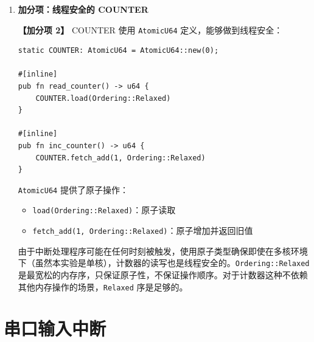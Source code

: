 \documentclass{SYSUReport}
\begin{document}
\begin{enumerate}[label={\chinese*、},labelsep=0pt, start=6]
    \item \textbf{加分项：线程安全的 COUNTER}

    \textbf{【加分项 2】} COUNTER 使用 \texttt{AtomicU64} 定义，能够做到线程安全：

    \begin{verbatim}
static COUNTER: AtomicU64 = AtomicU64::new(0);

#[inline]
pub fn read_counter() -> u64 {
    COUNTER.load(Ordering::Relaxed)
}

#[inline]
pub fn inc_counter() -> u64 {
    COUNTER.fetch_add(1, Ordering::Relaxed)
}
    \end{verbatim}

    \texttt{AtomicU64} 提供了原子操作：
    \begin{itemize}
        \item \texttt{load(Ordering::Relaxed)}：原子读取
        \item \texttt{fetch\_add(1, Ordering::Relaxed)}：原子增加并返回旧值
    \end{itemize}

    由于中断处理程序可能在任何时刻被触发，使用原子类型确保即使在多核环境下（虽然本实验是单核），计数器的读写也是线程安全的。\texttt{Ordering::Relaxed} 是最宽松的内存序，只保证原子性，不保证操作顺序。对于计数器这种不依赖其他内存操作的场景，\texttt{Relaxed} 序是足够的。

\end{enumerate}

\section{串口输入中断}
\end{document}
